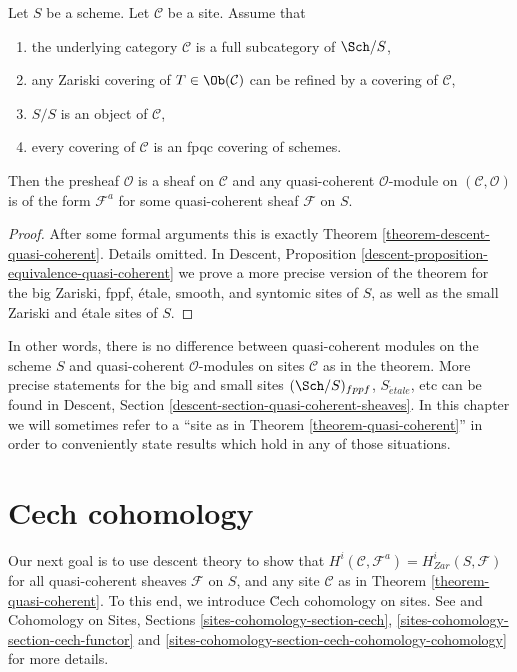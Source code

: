 \begin{theorem}
\label{theorem-quasi-coherent}
Let $S$ be a scheme.
Let $\mathcal{C}$ be a site. Assume that
\begin{enumerate}
\item the underlying category $\mathcal{C}$ is a
full subcategory of $\Sch/S$,
\item any Zariski covering of $T \in \Ob(\mathcal{C})$
can be refined by a covering of $\mathcal{C}$,
\item $S/S$ is an object of $\mathcal{C}$,
\item every covering of $\mathcal{C}$ is an fpqc covering of schemes.
\end{enumerate}
Then the presheaf $\mathcal{O}$ is a sheaf on $\mathcal{C}$ and
any quasi-coherent $\mathcal{O}$-module on $(\mathcal{C}, \mathcal{O})$
is of the form $\mathcal{F}^a$ for some quasi-coherent sheaf
$\mathcal{F}$ on $S$.
\end{theorem}

\begin{proof}
After some formal arguments this is exactly Theorem
\ref{theorem-descent-quasi-coherent}. Details omitted. In
Descent, Proposition \ref{descent-proposition-equivalence-quasi-coherent}
we prove a more precise version of the theorem for the
big Zariski, fppf, \'etale, smooth, and syntomic sites of $S$,
as well as the small Zariski and \'etale sites of $S$.
\end{proof}

\noindent
In other words, there is no difference between quasi-coherent
modules on the scheme $S$ and quasi-coherent $\mathcal{O}$-modules
on sites $\mathcal{C}$ as in the theorem. More precise statements
for the big and small sites $(\Sch/S)_{fppf}$, $S_{\acute{e}tale}$, etc
can be found in
Descent, Section \ref{descent-section-quasi-coherent-sheaves}.
In this chapter we will sometimes refer to a
``site as in Theorem \ref{theorem-quasi-coherent}''
in order to conveniently state results which hold in any of those
situations.






\section{Cech cohomology}
\label{section-cech-cohomology}

\noindent
Our next goal is to use descent theory to show that
$H^i(\mathcal{C}, \mathcal{F}^a) = H_{Zar}^i(S, \mathcal{F})$
for all quasi-coherent sheaves $\mathcal{F}$ on $S$, and
any site $\mathcal{C}$ as in Theorem \ref{theorem-quasi-coherent}.
To this end, we introduce \u Cech cohomology on sites.
See \cite{ArtinTopologies} and
Cohomology on Sites, Sections \ref{sites-cohomology-section-cech},
\ref{sites-cohomology-section-cech-functor}
and \ref{sites-cohomology-section-cech-cohomology-cohomology}
for more details.

